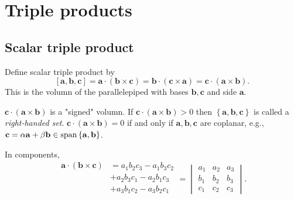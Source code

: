 \documentclass[10pt]{article}
\begin{document}
    \section{Triple products}
    \subsection{Scalar triple product}
    \begin{definition}
        Define scalar triple product by
        \[
            [\mathbf{a},\mathbf{b},\mathbf{c}]=\mathbf{a}\cdot (\mathbf{b} \times \mathbf{c})=\mathbf{b}\cdot (\mathbf{c} \times \mathbf{a})=\mathbf{c}\cdot (\mathbf{a}\times \mathbf{b})
        .\]
        This is the volumn of the parallelepiped with bases $ \mathbf{b}, \mathbf{c} $ and side $ \mathbf{a} .$
    \end{definition}
    \begin{remark}
        $ \mathbf{c}\cdot (\mathbf{a}\times \mathbf{b}) $ is a "signed" volumn. If $ \mathbf{c}\cdot (\mathbf{a}\times \mathbf{b})>0 $ then $ \left\{ \mathbf{a},\mathbf{b},\mathbf{c}\right\} $ is called a \textit{right-handed set}. $ \mathbf{c}\cdot (\mathbf{a}\times \mathbf{b})=0 $ if and only if $ \mathbf{a},\mathbf{b},\mathbf{c} $ are coplanar, e.g., $ \mathbf{c}=\alpha \mathbf{a}+\beta \mathbf{b} \in \operatorname{span}\left\{ \mathbf{a},\mathbf{b}\right\}$.
    \end{remark}
    In components, 
    \[
        \begin{aligned}
            \mathbf{a}\cdot (\mathbf{b}\times \mathbf{c})&=a_1b_2c_3-a_1b_3c_2 \\
            &+a_2b_3c_1-a_2b_1c_3\\
            &+a_3b_1c_2-a_3b_2c_1\\
        \end{aligned} =\begin{vmatrix}
            a_{1} & a_{2} & a_{3} \\
            b_{1} & b_{2} & b_{3} \\
            c_{1} & c_{2} & c_{3}
        \end{vmatrix}.
    \]
\end{document}
